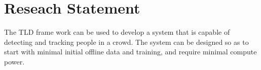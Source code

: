 \section{Reseach Statement}
The TLD frame work can be used to develop a system that is capable of detecting and tracking people in a crowd.
The system can be designed so as to start with minimal initial offline data and training, and require minimal compute power.
